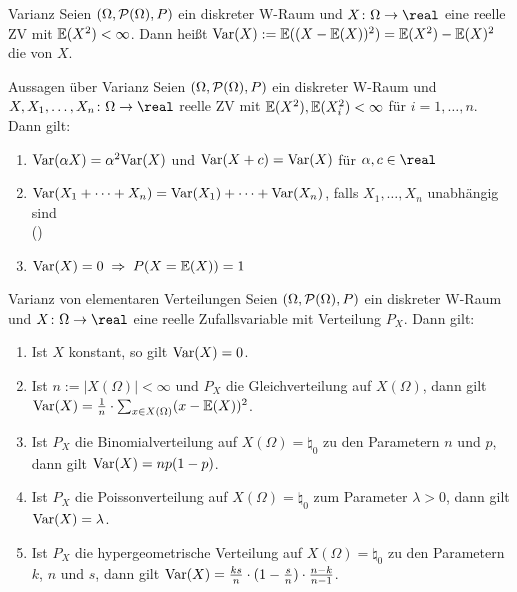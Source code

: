 \begin{Def}{Varianz}
    Seien $(\Omega, \P(\Omega), P)$ ein diskreter W-Raum und
    $X\colon \Omega \rightarrow \real$ eine reelle ZV mit $\EW(X^2) < \infty$.
    Dann heißt $\Var(X) := \EW((X - \EW(X))^2) = \EW(X^2) - \EW(X)^2$
    die  von $X$.
\end{Def}

\begin{Satz}{Aussagen über Varianz}
    Seien $(\Omega, \P(\Omega), P)$ ein diskreter W-Raum und\\
    $X, X_1, \dotsc, X_n\colon \Omega \rightarrow \real$ reelle ZV mit
    $\EW(X^2), \EW(X_i^2) < \infty$ für $i = 1, \dotsc, n$.
    Dann gilt:
    \begin{enumerate}
        \item
        $\Var(\alpha X) = \alpha^2 \Var(X)$ und
        $\Var(X + c) = \Var(X)$ für $\alpha, c \in \real$
        
        \item
        $\Var(X_1 + \dotsb + X_n) = \Var(X_1) + \dotsb + \Var(X_n)$,
        falls $X_1, \dotsc, X_n$ unabhängig sind\\
        ()
        
        \item
        $\Var(X) = 0 \;\Rightarrow\; P(X = \EW(X)) = 1$
    \end{enumerate}
\end{Satz}

\linie

\begin{Satz}{Varianz von elementaren Verteilungen}
    Seien $(\Omega, \P(\Omega), P)$ ein diskreter W-Raum und
    $X\colon \Omega \rightarrow \real$ eine reelle Zufallsvariable mit Verteilung $P_X$.
    Dann gilt:
    \begin{enumerate}
        \item
        Ist $X$ konstant, so gilt $\Var(X) = 0$.
        
        \item
        Ist $n := |X(\Omega)| < \infty$ und $P_X$ die Gleichverteilung auf $X(\Omega)$, dann gilt\\
        $\Var(X) = \frac{1}{n} \cdot \sum_{x \in X(\Omega)} (x - \EW(X))^2$.
        
        \item
        Ist $P_X$ die Binomialverteilung auf $X(\Omega) = \natural_0$
        zu den Parametern $n$ und $p$, dann gilt $\Var(X) = np(1 - p)$.
        
        \item
        Ist $P_X$ die Poissonverteilung auf $X(\Omega) = \natural_0$ zum Parameter $\lambda > 0$,
        dann gilt $\Var(X) = \lambda$.
        
        \item
        Ist $P_X$ die hypergeometrische Verteilung auf $X(\Omega) = \natural_0$ zu den Parametern
        $k$, $n$ und $s$, dann gilt
        $\Var(X) = \frac{ks}{n} \cdot (1 - \frac{s}{n}) \cdot \frac{n - k}{n - 1}$.
    \end{enumerate}
\end{Satz}

